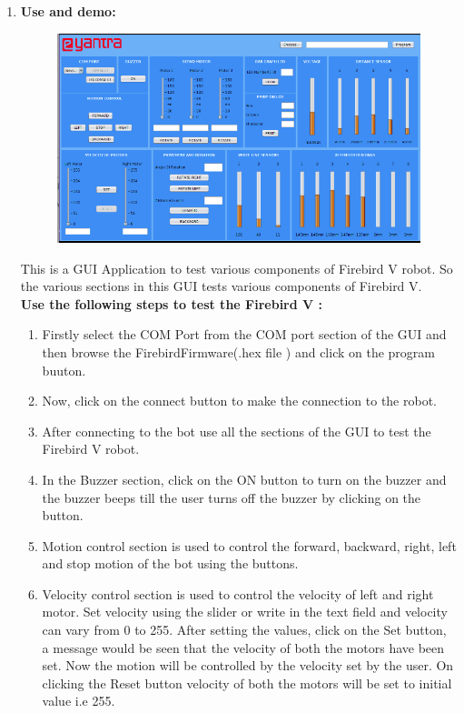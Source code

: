 \documentclass[a4paper,12pt,oneside]{book}
\newcommand{\head}[1]{\textnormal{\textbf{#1}}}
\begin{document}
\begin{enumerate}
	\item \textbf{\large Use and demo:}
    \begin{figure}[h]
	    \begin{center}
		    \includegraphics[scale=0.60]{GUI.png}
	    \end{center}
    \end{figure}
    This is a GUI Application to test various components of Firebird V robot. So the various sections in this GUI tests various components of Firebird V.\\
    \newpage
    \head{Use the following steps to test the Firebird V : }
    \begin{enumerate}
    \item Firstly select the COM Port from the COM port section of the GUI and then browse the FirebirdFirmware(.hex file ) and click on the program buuton.
    \item Now, click on the connect button to make the connection to the robot.
    \item After connecting to the bot use all the sections of the GUI to test the Firebird V robot.
    \item In the Buzzer section, click on the ON button to turn on the buzzer and the buzzer beeps till the user turns off the buzzer by clicking on the button.
    \item Motion control section is used to control the forward, backward, right, left and stop motion of the bot using the buttons.
    \item Velocity control section is used to control the velocity of left and right motor. Set velocity using the slider or write in the text field and velocity can vary from 0 to 255. After setting the values, click on the Set button, a message would be seen that the velocity of both the motors have been set. Now the motion will be controlled by the velocity set by the user. On clicking the Reset button velocity of both the motors will be set to initial value i.e 255.

\end{enumerate}
\end{enumerate}
\end{document}
